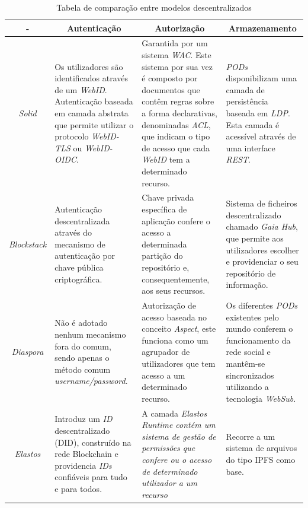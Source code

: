 \begin{center}
\small
\begin{longtable}{c|p{3.4cm}|p{3.4cm}|p{3.4cm}}
\caption{Tabela de comparação entre modelos descentralizados}
\label{tabela_comparacao_modelos_descentralizados}
\\
\toprule 
    \multicolumn{1}{c}{-} &
    \multicolumn{1}{c}{Autenticação} &
    \multicolumn{1}{c}{Autorização} &
    \multicolumn{1}{c}{Armazenamento}
    \\ \midrule\addlinespace[2pt] \endhead
\bottomrule\endfoot
\endlastfoot

\emph{Solid} & Os utilizadores são identificados através de um \emph{WebID}. Autenticação baseada em camada abstrata que permite utilizar o protocolo \emph{WebID-TLS} ou \emph{WebID-OIDC}\cite{solid_spec}. &  Garantida por um sistema \emph{\acrshort{WAC}}. Este sistema por sua vez é composto por documentos que contêm regras sobre a forma declarativas, denominadas \emph{\acrfull{ACL}}, que indicam o tipo de acesso que cada \emph{WebID} tem a determinado recurso\cite{solid_web_access_control}. & \emph{PODs} disponibilizam uma camada de persistência baseada em \emph{\acrshort{LDP}}. Esta camada é acessível através de uma interface \emph{\acrshort{REST}}\cite{solid_spec}. \\
\emph{Blockstack} & Autenticação descentralizada através do mecanismo de autenticação por chave pública criptográfica\cite{blockstack_white_paper}. & Chave privada específica de aplicação confere o acesso a determinada partição do repositório e, consequentemente, aos seus recursos\cite{blockstack_white_paper}. & Sistema de ficheiros descentralizado chamado \emph{Gaia Hub}, que permite aos utilizadores escolher e providenciar o seu repositório de informação\cite{blockstack_white_paper}. \\
\emph{Diaspora} & Não é adotado nenhum mecanismo fora do comum, sendo apenas o método comum \emph{username/password}\cite{diaspora_wiki}. & Autorização de acesso baseada no conceito \emph{Aspect}, este funciona como um agrupador de utilizadores que tem acesso a um determinado recurso\cite{diaspora_wiki}. & Os diferentes \emph{PODs} existentes pelo mundo conferem o funcionamento da rede social e mantêm-se sincronizados utilizando a tecnologia \emph{WebSub}\cite{diaspora_wiki}. \\
\emph{Elastos} & Introduz um \emph{ID} descentralizado (\acrshort{DID}), construído na rede Blockchain e providencia \emph{IDs} confiáveis para tudo e para todos\cite{elastos_white_paper}. & A camada \emph{Elastos Runtime contém um sistema de gestão de permissões que confere ou o acesso de determinado utilizador a um recurso}\cite{elastos_white_paper} & Recorre a um sistema de arquivos do tipo \acrshort{IPFS} como base\cite{elastos_developer}.
\end{longtable}
\end{center}

